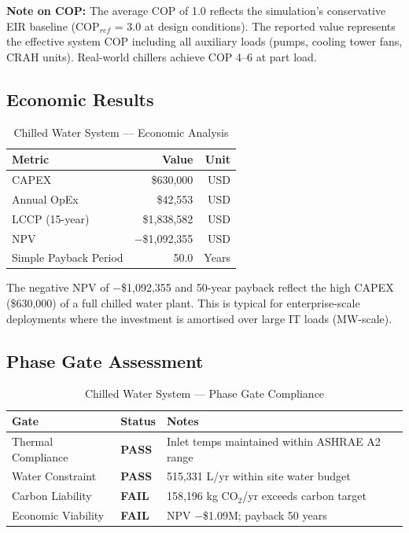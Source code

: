 \documentclass[12pt,a4paper]{report}
\newcommand{\pass}{\textcolor{passgreen}{\textbf{PASS}}}
\newcommand{\fail}{\textcolor{failred}{\textbf{FAIL}}}
\begin{document}
\noindent\textbf{Note on COP:} The average COP of 1.0 reflects the simulation's conservative EIR
baseline (COP$_{ref}$ = 3.0 at design conditions). The reported value represents the effective
system COP including all auxiliary loads (pumps, cooling tower fans, CRAH units).
Real-world chillers achieve COP 4--6 at part load.

\subsection{Economic Results}

\begin{table}[H]
\centering
\caption{Chilled Water System --- Economic Analysis}
\label{tab:chw_econ}
\renewcommand{\arraystretch}{1.3}
\begin{tabular}{lrr}
\toprule
\textbf{Metric} & \textbf{Value} & \textbf{Unit} \\
\midrule
CAPEX & \$630{,}000 & USD \\
Annual OpEx & \$42{,}553 & USD \\
LCCP (15-year) & \$1{,}838{,}582 & USD \\
NPV & $-$\$1{,}092{,}355 & USD \\
Simple Payback Period & 50.0 & Years \\
\bottomrule
\end{tabular}
\end{table}

\noindent The negative NPV of $-$\$1{,}092{,}355 and 50-year payback reflect the high CAPEX
(\$630{,}000) of a full chilled water plant. This is typical for enterprise-scale deployments
where the investment is amortised over large IT loads (MW-scale).

\subsection{Phase Gate Assessment}

\begin{table}[H]
\centering
\caption{Chilled Water System --- Phase Gate Compliance}
\label{tab:chw_gates}
\renewcommand{\arraystretch}{1.3}
\begin{tabular}{llp{8cm}}
\toprule
\textbf{Gate} & \textbf{Status} & \textbf{Notes} \\
\midrule
Thermal Compliance & \pass & Inlet temps maintained within ASHRAE A2 range \\
Water Constraint & \pass & 515{,}331 L/yr within site water budget \\
Carbon Liability & \fail & 158{,}196 kg CO$_2$/yr exceeds carbon target \\
Economic Viability & \fail & NPV $-$\$1.09M; payback 50 years \\
\bottomrule
\end{tabular}
\end{table}
\end{document}
